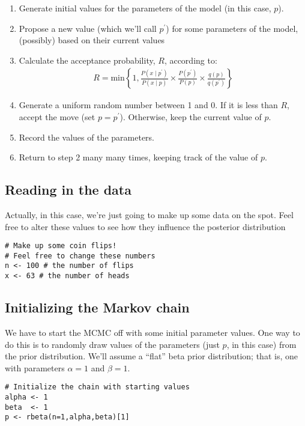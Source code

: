 \begin{enumerate}
	\item Generate initial values for the parameters of the model (in this case, $p$).
	\item Propose a new value (which we'll call $p^\prime$) for some parameters of the model, (possibly) based on their current values 
	\item Calculate the acceptance probability, $R$, according to:
	\begin{align*}
		R = \text{min}\left\{1, \frac{P(x \mid p^\prime)}{P(x \mid p)} \times \frac{P(p^\prime)}{P(p)} \times \frac{q(p)}{q(p^\prime)} \right\}
	\end{align*}
	\item Generate a uniform random number between 1 and 0. If it is less than $R$, accept the move (set $p = p^\prime$). Otherwise, keep the current value of $p$.
	\item Record the values of the parameters.
	\item Return to step 2 many many times, keeping track of the value of $p$.
\end{enumerate}

\subsection{Reading in the data}
Actually, in this case, we're just going to make up some data on the spot.
Feel free to alter these values to see how they influence the posterior distribution
{\tt \begin{snugshade*}
\begin{lstlisting}    
# Make up some coin flips!
# Feel free to change these numbers
n <- 100 # the number of flips
x <- 63	# the number of heads
\end{lstlisting}
\end{snugshade*}}

\subsection{Initializing the Markov chain}
We have to start the MCMC off with some initial parameter values.
One way to do this is to randomly draw values of the parameters (just $p$, in this case) from the prior distribution.
We'll assume a ``flat'' beta prior distribution; that is, one with parameters $\alpha = 1$ and $\beta = 1$.
{\tt \begin{snugshade*}
\begin{lstlisting}
# Initialize the chain with starting values
alpha <- 1
beta  <- 1
p <- rbeta(n=1,alpha,beta)[1]
\end{lstlisting}
\end{snugshade*}}
\pagebreak
